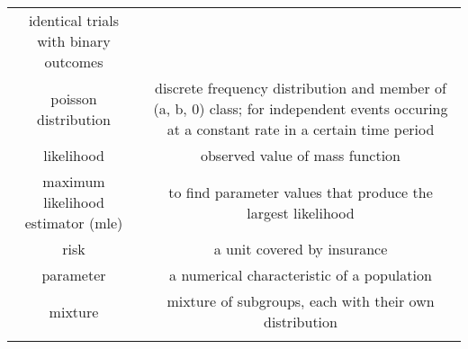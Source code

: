 \documentclass[]{book}
\theoremstyle{definition}
\theoremstyle{definition}
\theoremstyle{definition}
\theoremstyle{remark}
\begin{document}
\begin{longtable}[]{@{}cc@{}}
\begin{minipage}[t]{0.43\columnwidth}
identical trials with binary outcomes\strut
\end{minipage}\tabularnewline
\begin{minipage}[t]{0.43\columnwidth}\centering\strut
poisson distribution\strut
\end{minipage} & \begin{minipage}[t]{0.43\columnwidth}\centering\strut
discrete frequency distribution and member of (a, b, 0) class; for
independent events occuring at a constant rate in a certain time
period\strut
\end{minipage}\tabularnewline
\begin{minipage}[t]{0.43\columnwidth}\centering\strut
likelihood\strut
\end{minipage} & \begin{minipage}[t]{0.43\columnwidth}\centering\strut
observed value of mass function\strut
\end{minipage}\tabularnewline
\begin{minipage}[t]{0.43\columnwidth}\centering\strut
maximum likelihood estimator (mle)\strut
\end{minipage} & \begin{minipage}[t]{0.43\columnwidth}\centering\strut
to find parameter values that produce the largest likelihood\strut
\end{minipage}\tabularnewline
\begin{minipage}[t]{0.43\columnwidth}\centering\strut
risk\strut
\end{minipage} & \begin{minipage}[t]{0.43\columnwidth}\centering\strut
a unit covered by insurance\strut
\end{minipage}\tabularnewline
\begin{minipage}[t]{0.43\columnwidth}\centering\strut
parameter\strut
\end{minipage} & \begin{minipage}[t]{0.43\columnwidth}\centering\strut
a numerical characteristic of a population\strut
\end{minipage}\tabularnewline
\begin{minipage}[t]{0.43\columnwidth}\centering\strut
mixture\strut
\end{minipage} & \begin{minipage}[t]{0.43\columnwidth}\centering\strut
mixture of subgroups, each with their own distribution\strut
\end{minipage}\tabularnewline
\begin{minipage}[t]{0.43\columnwidth}\centering\strut

\end{minipage}
\end{longtable}
\end{document}
